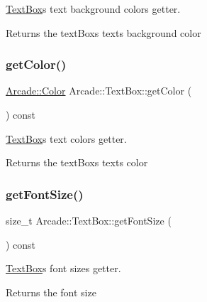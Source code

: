 \hyperlink{class_arcade_1_1_text_box}{Text\+Box}\textquotesingle{}s text background color\textquotesingle{}s getter. 

\begin{DoxyReturn}{Returns}
the text\+Box\textquotesingle{}s text\textquotesingle{}s background color 
\end{DoxyReturn}
\mbox{\label{class_arcade_1_1_text_box_a5fb50d6e6e1b2145a39b962ebd1016c7}} 
\subsubsection{\texorpdfstring{get\+Color()}{getColor()}}
{\footnotesize\ttfamily \hyperlink{class_arcade_1_1_color}{Arcade\+::\+Color} Arcade\+::\+Text\+Box\+::get\+Color (\begin{DoxyParamCaption}{ }\end{DoxyParamCaption}) const}



\hyperlink{class_arcade_1_1_text_box}{Text\+Box}\textquotesingle{}s text color\textquotesingle{}s getter. 

\begin{DoxyReturn}{Returns}
the text\+Box\textquotesingle{}s text\textquotesingle{}s color 
\end{DoxyReturn}
\mbox{\label{class_arcade_1_1_text_box_a8b8735d3c752067da9fc88f1e5fe1164}} 
\subsubsection{\texorpdfstring{get\+Font\+Size()}{getFontSize()}}
{\footnotesize\ttfamily size\+\_\+t Arcade\+::\+Text\+Box\+::get\+Font\+Size (\begin{DoxyParamCaption}{ }\end{DoxyParamCaption}) const}



\hyperlink{class_arcade_1_1_text_box}{Text\+Box}\textquotesingle{}s font size\textquotesingle{}s getter. 

\begin{DoxyReturn}{Returns}
the font size 
\end{DoxyReturn}
\mbox{\label{class_arcade_1_1_text_box_aaaf37e50180337a66b0895bffce126b7}} 
